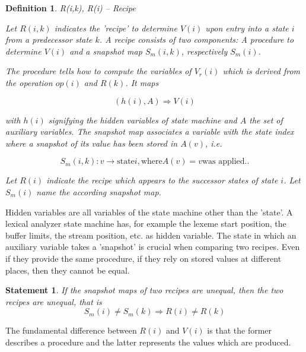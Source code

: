 \documentclass[12pt,a4paper]{scrartcl}
\newtheorem{definition}{Definition}
\newtheorem{statement}{Statement}
\begin{document}
\begin{definition}
R(i,k), R(i) -- Recipe 

Let $R(i,k)$ indicates the 'recipe' to determine $V(i)$ upon entry into a state
$i$ from a predecessor state $k$.  A recipe consists of two components: A
procedure to determine $V(i)$ and a snapshot map $S_m(i,k)$, respectively
$S_m(i)$.

The \textit{procedure} tells how to compute the variables of $V_r(i)$ which is derived
from the operation $op(i)$ and $R(k)$.  It maps

\begin{equation} \label{eq:recipe-procedure}
    (h(i), A) \Rightarrow V(i)                                             
\end{equation}

with $h(i)$ signifying the hidden variables of state machine and $A$ the set of
auxiliary variables.  The \textit{snapshot map} associates a variable with the state
index where a snapshot of its value has been stored in $A(v)$, i.e.

\begin{equation}
    \label{eq:snapshot-map}
    S_m(i,k):  v \rightarrow \mbox{state} i, \mbox{where} A(v) = v \mbox{was applied.}.
\end{equation}

Let $R(i)$ indicate the recipe which appears to the successor states of
state $i$. Let $S_m(i)$ name the according snapshot map.
\end{definition}

Hidden variables are all variables of the state machine other than the 'state'.
A lexical analyzer state machine has, for example the lexeme start position,
the buffer limits, the stream position, etc. as hidden variable. The state
in which an auxiliary variable takes a 'snapshot' is crucial when comparing
two recipes. Even if they provide the same procedure, if they rely on stored
values at different places, then they cannot be equal.

\begin{statement}
   If the snapshot maps of two recipes are unequal, then the two recipes
   are unequal, that is
   \begin{equation} \label{eq:snapshot-map-difference}
       S_m(i) \neq S_m(k) \Rightarrow R(i) \neq R(k)
   \end{equation}
\end{statement}

The fundamental difference between $R(i)$ and $V(i)$ is that the former describes
a procedure and the latter represents the values which are produced.
\end{document}
